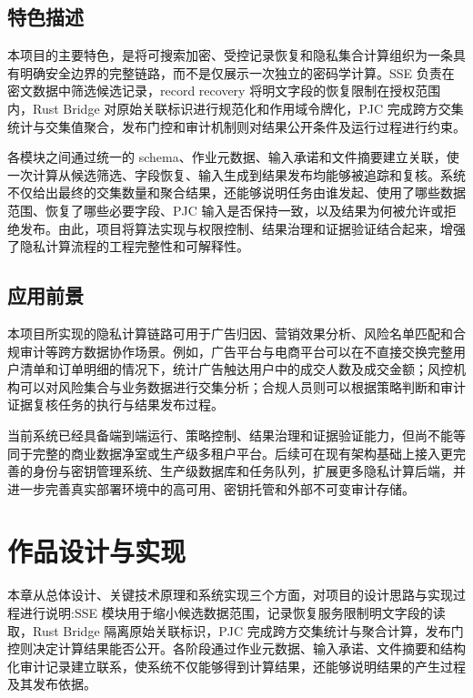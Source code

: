 \documentclass[UTF8,a4paper,12pt,oneside]{ctexrep}
\begin{document}
\section{特色描述}

本项目的主要特色，是将可搜索加密、受控记录恢复和隐私集合计算组织为一条具有明确安全边界的完整链路，而不是仅展示一次独立的密码学计算。SSE 负责在密文数据中筛选候选记录，record recovery 将明文字段的恢复限制在授权范围内，Rust Bridge 对原始关联标识进行规范化和作用域令牌化，PJC 完成跨方交集统计与交集值聚合，发布门控和审计机制则对结果公开条件及运行过程进行约束。

各模块之间通过统一的 schema、作业元数据、输入承诺和文件摘要建立关联，使一次计算从候选筛选、字段恢复、输入生成到结果发布均能够被追踪和复核。系统不仅给出最终的交集数量和聚合结果，还能够说明任务由谁发起、使用了哪些数据范围、恢复了哪些必要字段、PJC 输入是否保持一致，以及结果为何被允许或拒绝发布。由此，项目将算法实现与权限控制、结果治理和证据验证结合起来，增强了隐私计算流程的工程完整性和可解释性。

\section{应用前景}

本项目所实现的隐私计算链路可用于广告归因、营销效果分析、风险名单匹配和合规审计等跨方数据协作场景。例如，广告平台与电商平台可以在不直接交换完整用户清单和订单明细的情况下，统计广告触达用户中的成交人数及成交金额；风控机构可以对风险集合与业务数据进行交集分析；合规人员则可以根据策略判断和审计证据复核任务的执行与结果发布过程。

当前系统已经具备端到端运行、策略控制、结果治理和证据验证能力，但尚不能等同于完整的商业数据净室或生产级多租户平台。后续可在现有架构基础上接入更完善的身份与密钥管理系统、生产级数据库和任务队列，扩展更多隐私计算后端，并进一步完善真实部署环境中的高可用、密钥托管和外部不可变审计存储。


\chapter{作品设计与实现}

本章从总体设计、关键技术原理和系统实现三个方面，对项目的设计思路与实现过程进行说明:SSE 模块用于缩小候选数据范围，记录恢复服务限制明文字段的读取，Rust Bridge 隔离原始关联标识，PJC 完成跨方交集统计与聚合计算，发布门控则决定计算结果能否公开。各阶段通过作业元数据、输入承诺、文件摘要和结构化审计记录建立联系，使系统不仅能够得到计算结果，还能够说明结果的产生过程及其发布依据。
\end{document}
